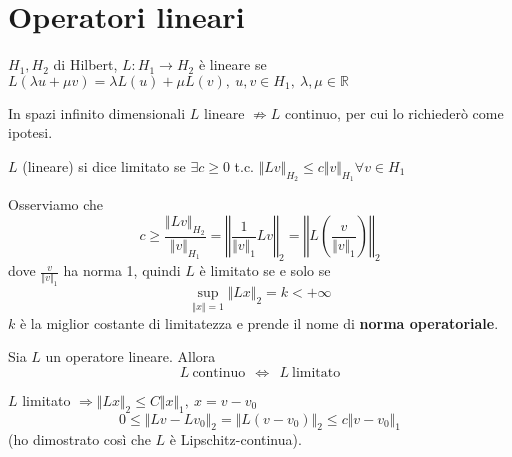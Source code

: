 \documentclass[10pt,a4paper,twoside,openright]{book}
\begin{document}
\section{Operatori lineari}
\begin{definition}
 $\displaystyle H_{1},H_{2}$ di Hilbert, $\displaystyle L:H_{1}\rightarrow H_{2}$ è lineare se $\displaystyle L(\lambda u+\mu v) =\lambda L(u) +\mu L(v),\ u,v\in H_{1},\ \lambda,\mu \in \mathbb{R}$
\end{definition}
\begin{nb}
In spazi infinito dimensionali $\displaystyle L$ lineare $\displaystyle \nRightarrow $$\displaystyle L$ continuo, per cui lo richiederò come ipotesi.
\end{nb}
\begin{definition}
 $\displaystyle L$ (lineare) si dice limitato se $\displaystyle \exists c\geqslant 0$ t.c. $\displaystyle \Vert Lv\Vert _{H_{2}} \leqslant c\Vert v\Vert _{H_{1}} \forall v\in H_{1}$
\end{definition}
Osserviamo che 
\begin{equation*}
c\geqslant \frac{\Vert Lv\Vert _{H_{2}}}{\Vert v\Vert _{H_{1}}} =\left\Vert \frac{1}{\Vert v\Vert _{1}} Lv\right\Vert _{2} =\left\Vert L\left(\frac{v}{\Vert v\Vert _{1}}\right)\right\Vert _{2}
\end{equation*}
dove $\displaystyle \frac{v}{\Vert v\Vert _{1}}$ ha norma 1, quindi $\displaystyle L$ è limitato se e solo se
\begin{equation*}
\sup _{\Vert x\Vert =1}\Vert Lx\Vert _{2} =k< +\infty 
\end{equation*}
$\displaystyle k$ è la miglior costante di limitatezza e prende il nome di \textbf{norma operatoriale}.
\begin{theorem}
Sia $\displaystyle L$ un operatore lineare. Allora
\begin{equation}
L\ \text{continuo} \ \ \Leftrightarrow \ \ L\ \text{limitato}
\label{eq:continuo-limitato}
\end{equation}
\end{theorem}
\begin{dimostrazione}
$\displaystyle L$ limitato $\displaystyle \Rightarrow \Vert Lx\Vert _{2} \leqslant C\Vert x\Vert _{1},\ x=v-v_{0}$
\begin{equation*}
0\leqslant \Vert Lv-Lv_{0}\Vert _{2} =\Vert L(v-v_{0})\Vert _{2} \leqslant c\Vert v-v_{0}\Vert _{1}
\end{equation*}
(ho dimostrato così che $\displaystyle L$ è Lipschitz-continua).
\end{dimostrazione}
\end{document}
